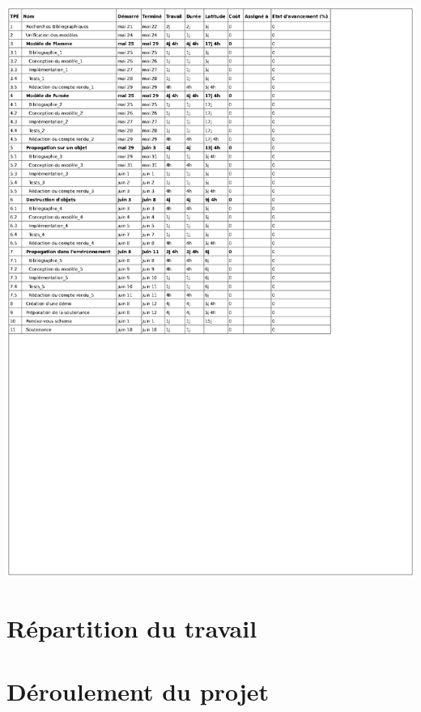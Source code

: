 \documentclass[a4paper,10pt]{article}
\begin{document}
	\includegraphics[scale=0.8]{../Planning/Planning.ps}


\section{Répartition du travail}


\section{Déroulement du projet}

\end{document}
